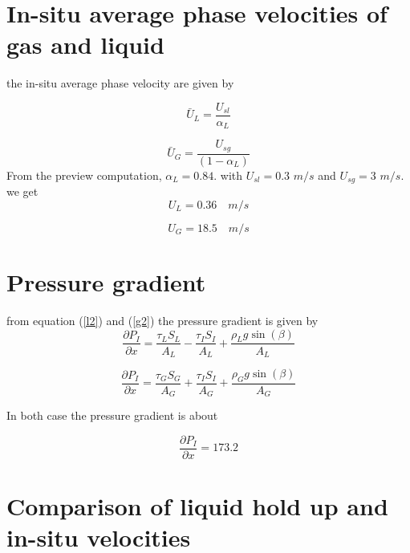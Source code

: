 \documentclass[10pt,a4paper]{report}
\begin{document}
\section{In-situ average phase velocities of gas and liquid  }
the in-situ average phase velocity are given by

\begin{equation}
\bar{U}_{L} = \frac{U_{sl}}{\alpha_{L}}
\end{equation}

\begin{equation}
\bar{U}_{G} = \frac{U_{sg}}{(1-\alpha_{L})}
\end{equation}
From the preview computation, $\alpha_{L} = 0.84$. with $U_{sl}=0.3$ $m/s$ and 
$U_{sg} = 3$ $m/s$. we get
\begin{equation}
U_{L} = 0.36\quad m/s \nonumber
\end{equation}

\begin{equation}
U_{G} = 18.5 \quad m/s \nonumber
\end{equation}

\section{Pressure gradient }
from equation (\ref{l2}) and (\ref{g2}) the pressure gradient is given by
\begin{equation}\label{ll}
\frac{\partial P_{I}}{\partial x}=\frac{\tau_{L}S_{L}}{A_{L}}-\frac{\tau_{I}S_{I}}{A_{L}}+\frac{\rho_{L}g\sin (\beta)}{A_{L}} 
\end{equation}

\begin{equation} \label{gg}
\frac{\partial P_{I}}{\partial x}=\frac{\tau_{G}S_{G}}{A_{G}}+\frac{\tau_{I}S_{I}}{A_{G}}+\frac{\rho_{G}g\sin (\beta)}{A_{G}}  
\end{equation} 

In both case the pressure gradient is about 

\begin{equation}
\frac{\partial P_{I}}{\partial x} = 173.2
\end{equation}

\section{Comparison of liquid hold up and in-situ velocities}
\end{document}
